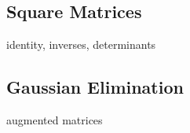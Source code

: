 \subsection{Square Matrices}
identity, inverses, determinants 
\subsection{Gaussian Elimination}
augmented matrices




